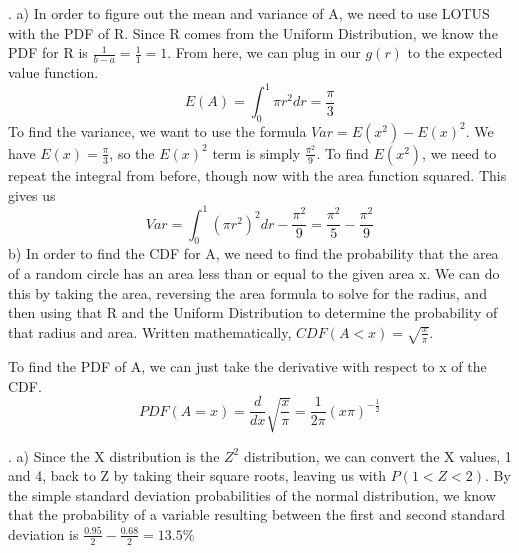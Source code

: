 \documentclass[11pt]{article}
\begin{document}
. 
	a) In order to figure out the mean and variance of A, we need to use LOTUS with the PDF of R. Since R comes from the Uniform Distribution, we know the PDF for R is $\frac{1}{b-a} = \frac{1}{1} = 1$.  From here, we can plug in our $g(r)$ to the expected value function.  
	$$ E(A) = \int^1_0\pi r^2dr = \boxed{\frac{\pi}{3}}$$
	To find the variance, we want to use the formula $Var = E(x^2) - E(x)^2$.  We have $E(x)=\frac{\pi}{3}$, so the $E(x)^2$ term is simply $\frac{\pi^2}{9}$.  To find $E(x^2)$, we need to repeat the integral from before, though now with the area function squared.  
	This gives us
	$$ Var = \int^1_0(\pi r^2)^2dr - \frac{\pi^2}{9} = \boxed{\frac{\pi^2}{5}  - \frac{\pi^2}{9}}$$
	b)
		In order to find the CDF for A, we need to find the probability that the area of a random circle has an area less than or equal to the given area x.  We can do this by taking the area, reversing the area formula to solve for the radius, and then using that R and the Uniform Distribution to determine the probability of that radius and area.   Written mathematically, $\boxed{CDF(A<x) = \sqrt{\frac{x}{\pi}}}$.

		To find the PDF of A, we can just take the derivative with respect to x of the CDF.  
		$$PDF(A=x) =\frac{d}{dx}\sqrt{\frac{x}{\pi}} = \boxed{\frac{1}{2\pi}(x\pi)^{-\frac{1}{2}}}$$
    
\bigskip

. 
\smallskip
    a) Since the X distribution is the $Z^2$ distribution, we can convert the X values, 1 and 4, back to Z by taking their square roots, leaving us with $P(1<Z<2)$.  By the simple standard deviation probabilities of the normal distribution, we know that the probability of a variable resulting between the first and second standard deviation is $\frac{0.95}{2}-\frac{0.68}{2} = \boxed{13.5\%}$
\smallskip
\end{document}
